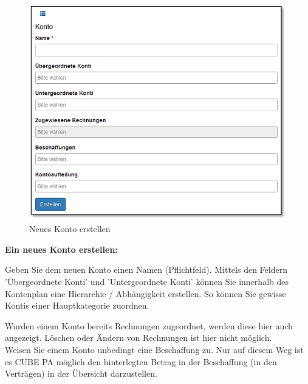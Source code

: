 \vspace{\baselineskip}


\begin{figure}   %
  \vspace{-35pt}      %
  \begin{center}
    \includegraphics[width=1\linewidth]{../chapters/07_Controlling/pictures/contr_KontoErstellen.jpg}
  \end{center}
  \vspace{-20pt}
  \caption{Neues Konto erstellen}
  \vspace{-10pt}
\end{figure}
\textbf{Ein neues Konto erstellen:} 

\pagebreak
Geben Sie dem neuen Konto einen Namen (Pflichtfeld). Mittels den Feldern 'Übergeordnete Konti' und 'Untergeordnete Konti' können Sie innerhalb des Kontenplan eine Hierarchie / Abhängigkeit erstellen. So können Sie gewisse Kontis einer Hauptkategorie zuordnen.

\vspace{\baselineskip}

Wurden einem Konto bereits Rechnungen zugeordnet, werden diese hier auch angezeigt. Löschen oder Ändern von Rechnungen ist hier nicht möglich.\\
Weisen Sie einem Konto unbedingt eine Beschaffung zu. Nur auf diesem Weg ist es CUBE PA möglich den hinterlegten Betrag in der Beschaffung (in den Verträgen) in der Übersicht darzustellen.

